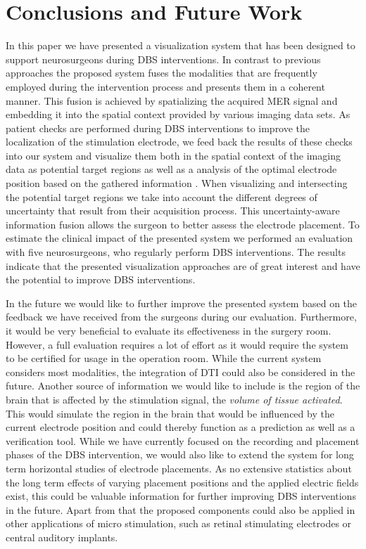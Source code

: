 \documentclass[review]{vgtc}                 %
\begin{document}
\section{Conclusions and Future Work}\label{sec:conclusions}
In this paper we have presented a visualization system that has been designed to support neurosurgeons during DBS interventions. In contrast to previous approaches the proposed system fuses the modalities that are frequently employed during the intervention process and presents them in a coherent manner. This fusion is achieved by spatializing the acquired MER signal and embedding it into the spatial context provided by various imaging data sets. As patient checks are performed during DBS interventions to improve the localization of the stimulation electrode, we feed back the results of these checks into our system and visualize them both in the spatial context of the imaging data as potential target regions as well as a analysis of the optimal electrode position based on the gathered information . When visualizing and intersecting the potential target regions we take into account the different degrees of uncertainty that result from their acquisition process. This uncertainty-aware information fusion allows the surgeon to better assess the electrode placement. To estimate the clinical impact of the presented system we performed an evaluation with five neurosurgeons, who regularly perform DBS interventions. The results indicate that the presented visualization approaches are of great interest and have the potential to improve DBS interventions.

In the future we would like to further improve the presented system based on the feedback we have received from the surgeons during our evaluation. Furthermore, it would be very beneficial to evaluate its effectiveness in the surgery room. However, a full evaluation requires a lot of effort as it would require the system to be certified for usage in the operation room. While the current system considers most modalities, the integration of DTI could also be considered in the future. Another source of information we would like to include is the region of the brain that is affected by the stimulation signal, the \emph{volume of tissue activated}. This would simulate the region in the brain that would be influenced by the current electrode position and could thereby function as a prediction as well as a verification tool. While we have currently focused on the recording and placement phases of the DBS intervention, we would also like to extend the system for long term horizontal studies of electrode placements. As no extensive statistics about the long term effects of varying placement positions and the applied electric fields exist, this could be valuable information for further improving DBS interventions in the future. Apart from that the proposed components could also be applied in other applications of micro stimulation, such as retinal stimulating electrodes or central auditory implants.
\end{document}
